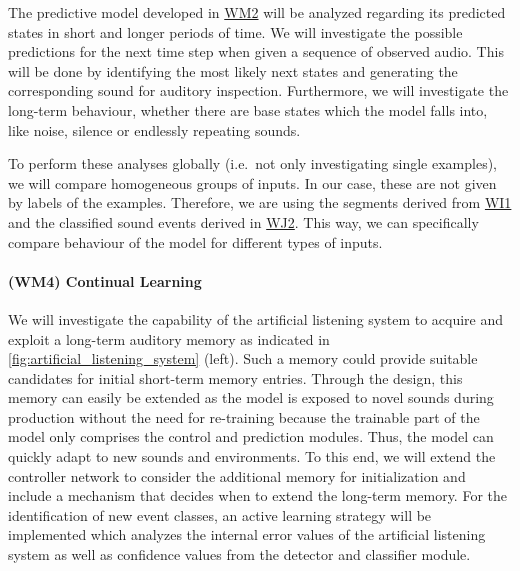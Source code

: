\documentclass[11pt]{article}
\newcommand{\wpdef}[2]{\hypertarget{sec:W#1}{\paragraph*{(W#1) #2}\label{sec:W#1}}}
\newcommand{\wpref}[2]{\hyperlink{sec:W#1}{#2}}
\begin{document}
The predictive model developed in \wpref{M2}{WM2} will be analyzed regarding its predicted states in short and longer periods of time.
We will investigate the possible predictions for the next time step when given a sequence of observed audio.
This will be done by identifying the most likely next states and generating the corresponding sound for auditory inspection.
Furthermore, we will investigate the long-term behaviour, whether there are base states which the model falls into, like noise, silence or endlessly repeating sounds.

To perform these analyses globally (i.e.~not only investigating single examples), we will compare homogeneous groups of inputs.
In our case, these are not given by labels of the examples.
Therefore, we are using the segments derived from \wpref{I1}{WI1} and the classified sound events derived in \wpref{J2}{WJ2}.
This way, we can specifically compare behaviour of the model for different types of inputs.

\wpdef{M4}{Continual Learning} %


We will investigate the capability of the artificial listening system to acquire and exploit a long-term auditory memory as indicated in \autoref{fig:artificial_listening_system} (left).
Such a memory could provide suitable candidates for initial short-term memory entries.
Through the design, this memory can easily be extended as the model is exposed to novel sounds during production without the need for re-training
because the trainable part of the model only comprises the control and prediction modules.
Thus, the model can quickly adapt to new sounds and  environments. 
%
To this end, we will extend the controller network to consider the additional memory for initialization and include a mechanism that decides when to extend the long-term memory.
%
For the identification of new event classes, an active learning strategy will be implemented which analyzes the internal error values of the artificial listening system as well as confidence values from the detector and classifier module.
\end{document}

